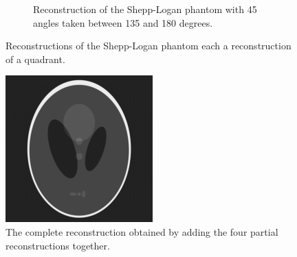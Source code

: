 \begin{figure}
\begin{subfigure}{0.48\linewidth}
		\caption{Reconstruction of the Shepp-Logan phantom with 45 angles taken between 135 and 180 degrees.}
	\end{subfigure}
	\caption{Reconstructions of the Shepp-Logan phantom each a reconstruction of a quadrant.}
	\label{partials}
\end{figure}
\begin{figure}
	\centering
	\includegraphics[width=0.5\linewidth]{Materials/complete}
	\caption{The complete reconstruction obtained by adding the four partial reconstructions together.}
	\label{complete}
\end{figure}
